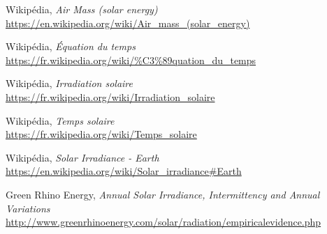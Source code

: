 \documentclass[12pt]{article}
\begin{document}
\begin{thebibliography}{99}
	Wikipédia,
	\emph{Air Mass (solar energy)}\\
	\url{https://en.wikipedia.org/wiki/Air_mass_(solar_energy)}

	Wikipédia,
	\emph{Équation du temps}\\
	\url{https://fr.wikipedia.org/wiki/%C3%89quation_du_temps}
	
	Wikipédia,
	\emph{Irradiation solaire}\\
	\url{https://fr.wikipedia.org/wiki/Irradiation_solaire}
	
	Wikipédia,
	\emph{Temps solaire}\\
	\url{https://fr.wikipedia.org/wiki/Temps_solaire}
	
	Wikipédia,
	\emph{Solar Irradiance - Earth}\\
	\url{https://en.wikipedia.org/wiki/Solar_irradiance#Earth}
	
	Green Rhino Energy,
	\emph{Annual Solar Irradiance, Intermittency and Annual Variations}\\
	\url{http://www.greenrhinoenergy.com/solar/radiation/empiricalevidence.php}

\end{thebibliography}
\end{document}
